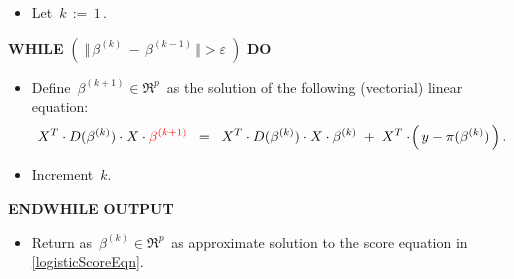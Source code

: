 \begin{proposition}
\begin{enumerate}
\begin{center}
\begin{minipage}{6in}
{\begin{itemize}
\begin{equation*}
			\end{equation*}
		\item
			Let \,$k \,:=\, 1$\,.
		\end{itemize}
	\vskip 0.2cm
	\textnormal{\bf WHILE} \; $\left(\;\Vert\,\beta^{(k)} \,-\, \beta^{(k-1)}\,\Vert > \varepsilon\;\right)$ \; \textnormal{\bf DO}
	\begin{itemize}
	\item
		Define \,$\beta^{(k+1)} \in \Re^{p}$\, as the solution of the following (vectorial) linear equation:
		\begin{equation*}
			X^{T} \cdot D(\beta^{(k)}) \cdot X \cdot {\color{red}\beta^{(k+1)}}
			\;\; = \;\;
				X^{T} \cdot D(\beta^{(k)}) \cdot X \cdot \beta^{(k)}
				\;+\; X^{T}\cdot\!\left(\,y - \pi(\beta^{(k)})\,\right).
		\end{equation*}
	\item
		Increment \,$k$.	
	\end{itemize}
	\textnormal{\bf ENDWHILE}
	\vskip 0.4cm
	\textnormal{\bf OUTPUT}
	\begin{itemize}
	\item
		Return as \,$\beta^{(k)} \in \Re^{p}$\, as approximate solution to the score equation
		in \eqref{logisticScoreEqn}.
	\end{itemize}
	}
	\end{minipage}
	\end{center}
\end{enumerate}
\end{proposition}
\proof
